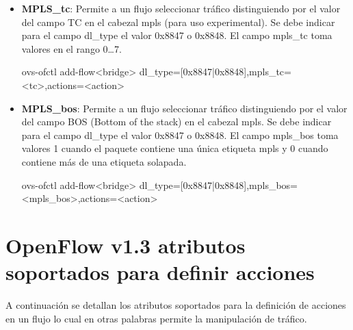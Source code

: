 \begin{itemize}
\item \textbf{MPLS\_tc}: Permite a un flujo seleccionar tr\'afico distinguiendo por el valor del campo TC en el cabezal mpls (para uso experimental). Se debe indicar para el campo dl\_type el valor 0x8847 o 0x8848. El campo mpls\_tc toma valores en el rango 0\dots 7.

\begin{center}
ovs-ofctl add-flow<bridge> dl\_type=[0x8847|0x8848],mpls\_tc=<tc>,actions=<action>
\end{center}

\item \textbf{MPLS\_bos}: Permite a un flujo seleccionar tr\'afico distinguiendo por el valor del campo BOS (Bottom of the stack) en el cabezal mpls. Se debe indicar para el campo dl\_type el valor 0x8847 o 0x8848. El campo mpls\_bos toma valores 1 cuando el paquete contiene una única etiqueta mpls y 0 cuando contiene m\'as de una etiqueta solapada.

\begin{center}
ovs-ofctl add-flow<bridge> dl\_type=[0x8847|0x8848],mpls\_bos=<mpls\_bos>,actions=<action>
\end{center}

\end{itemize}

\section{OpenFlow v1.3 atributos soportados para definir acciones}
A continuaci\'on se detallan los atributos soportados para la definici\'on de acciones en un flujo lo cual en otras palabras permite la manipulaci\'on de tr\'afico.

